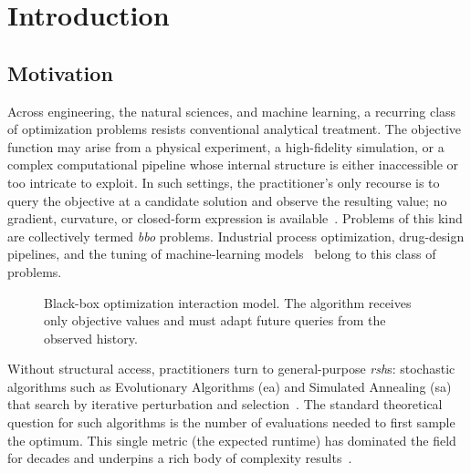 \chapter{Introduction}
\label{cha:intro}

\section{Motivation}
Across engineering, the natural sciences, and machine learning, a
recurring class of optimization problems resists conventional
analytical treatment. The objective function may arise from a physical
experiment, a high-fidelity simulation, or a complex computational
pipeline whose internal structure is either inaccessible or too
intricate to exploit.
In such settings, the practitioner's only recourse is to query the
objective at a candidate solution and observe the resulting value;
no gradient, curvature, or closed-form expression is
available~\cite{liu_primer_2020}. Problems of
this kind are collectively termed \textit{\acrfull{bbo}} problems.
Industrial process optimization, drug-design pipelines, and the tuning of
machine-learning models~\cite{bajaj2021black,bischl2017mlrmbo} belong
to this class of problems.

\begin{figure}[H]
  \centering
  \caption[Black-box optimization interaction model]{Black-box
    optimization interaction model. The algorithm receives
    only objective values and must adapt future queries from the
  observed history.}
  \label{fig:bbo-query-loop}
\end{figure}

Without structural access, practitioners turn to general-purpose
\textit{\acrfull{rsh}}s: stochastic algorithms such as Evolutionary
Algorithms (\acrshort{ea}) and Simulated Annealing (\acrshort{sa})
that search by iterative perturbation and
selection~\cite{abdel2018metaheuristic,rajwar2023exhaustive}. The
standard theoretical question for such algorithms is the number of
evaluations needed to first sample the optimum. This single
metric (the expected runtime) has dominated the field for decades
and underpins a rich body of complexity
results~\cite{droste2002analysis,doerr2020theory,lengler2019drift}.

